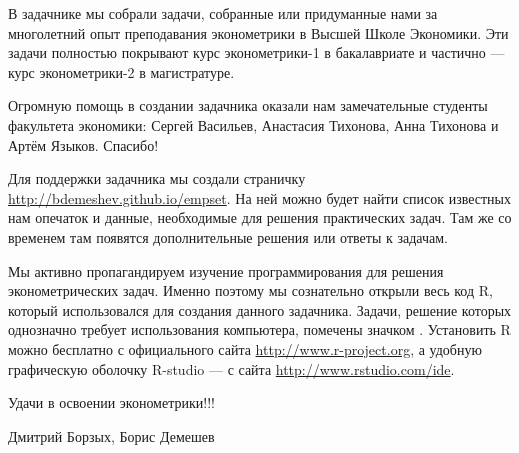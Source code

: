 \documentclass[11pt, openany]{book}
\theoremstyle{definition}
\begin{document}
\vspace{30pt}

В задачнике мы собрали задачи, собранные или придуманные нами за многолетний опыт преподавания эконометрики в Высшей Школе Экономики. Эти задачи полностью покрывают курс эконометрики-1 в бакалавриате и частично — курс эконометрики-2 в магистратуре.

Огромную помощь в создании задачника оказали нам замечательные студенты факультета экономики: Сергей Васильев, Анастасия Тихонова, Анна Тихонова и Артём Языков. Спасибо!

Для поддержки задачника мы создали страничку \url{http://bdemeshev.github.io/empset}. На ней можно будет найти список известных нам опечаток и данные, необходимые для решения практических задач. Там же со временем там появятся дополнительные решения или ответы к задачам.

Мы активно пропагандируем изучение программирования для решения эконометрических задач. Именно поэтому мы сознательно открыли  весь код R,  который использовался для создания данного задачника. Задачи, решение которых однозначно требует использования компьютера, помечены значком \useR. Установить R можно бесплатно с официального сайта \url{http://www.r-project.org}, а удобную графическую оболочку R-studio — с сайта \url{http://www.rstudio.com/ide}.

\vspace{30pt}

Удачи в освоении эконометрики!!!

\vspace{20pt}

\begin{flushright}
Дмитрий Борзых, Борис Демешев
\end{flushright}

























\end{document}
